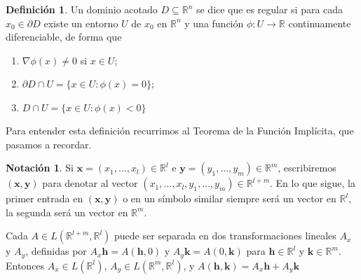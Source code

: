 \documentclass{report}
\newcommand{\realNumbers}{\mathbb{R}}
\theoremstyle{definition}
\newtheorem{definition}{Definición}
\newtheorem{notation}{Notación}
\theoremstyle{remark}
\begin{document}
  \begin{definition}
    Un dominio acotado \(D \subseteq \realNumbers^n\) se dice que es regular si para cada \(x_0 \in \partial D\) existe un entorno \(U\) de \(x_0\) en \(\realNumbers^n\) y una función \(\phi : U \rightarrow \realNumbers\) continuamente diferenciable, de forma que
    \begin{enumerate}
      \item \(\nabla \phi(x) \neq 0\) si \(x \in U\);
      \item \(\partial D \cap U = \{x \in U : \phi(x) = 0\}\);
      \item \(D \cap U = \{x \in U : \phi(x) < 0\}\)
    \end{enumerate}
  \end{definition}

  Para entender esta definición recurrimos al Teorema de la Función Implícita, que pasamos a recordar.

  \begin{notation}
    Si \(\mathbf{x} = (x_1, \dots, x_l) \in \realNumbers^l\) e \(\mathbf{y} = (y_1, \dots, y_m) \in \realNumbers^m\), escribiremos \((\mathbf{x}, \mathbf{y})\) para denotar al vector \((x_1, \dots, x_l, y_1, \dots, y_m) \in \realNumbers^{l + m}\).
    En lo que sigue, la primer entrada en \((\mathbf{x}, \mathbf{y})\) o en un símbolo similar siempre será un vector en \(\realNumbers^l\), la segunda será un vector en \(\realNumbers^m\).

    Cada \(A \in L(\realNumbers^{l + m}, \realNumbers^l)\) puede ser separada en dos transformaciones lineales \(A_x\) y \(A_y\), definidas por \(A_x \mathbf{h} = A(\mathbf{h}, 0)\) y \(A_y \mathbf{k} = A(0, \mathbf{k})\) para \(\mathbf{h} \in \realNumbers^l\) y \(\mathbf{k} \in \realNumbers^m\).
    Entonces \(A_x \in L(\realNumbers^l)\), \(A_y \in L(\realNumbers^m, \realNumbers^l)\), y \(A(\mathbf{h}, \mathbf{k}) = A_x \mathbf{h} + A_y \mathbf{k}\)
  \end{notation}
\end{document}
